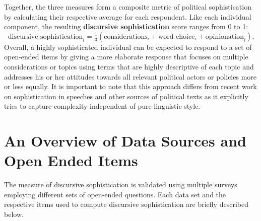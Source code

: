 \documentclass[12pt]{article}
\begin{document}
Together, the three measures form a composite metric of political sophistication by calculating their respective average for each respondent. Like each individual component, the resulting \textbf{discursive sophistication} score ranges from 0 to 1:
\begin{equation}
\text{discursive sophistication}_i = \tfrac{1}{3}(\text{considerations}_i + \text{word choice}_i + \text{opinionation}_i).
\end{equation}
Overall, a highly sophisticated individual can be expected to respond to a set of open-ended items by giving a more elaborate response that focuses on multiple considerations or topics using terms that are highly descriptive of each topic and addresses his or her attitudes towards all relevant political actors or policies more or less equally. It is important to note that this approach differs from recent work on sophistication in speeches and other sources of political texts \citep[e.g.,][]{spirling2016democratization,benoit2017measuring} as it explicitly tries to capture complexity independent of pure linguistic style.



\section*{An Overview of Data Sources and Open Ended Items}

The measure of discursive sophistication is validated using multiple surveys employing different sets of open-ended questions. Each data set and the respective items used to compute discursive sophistication are briefly described below. %
\end{document}
